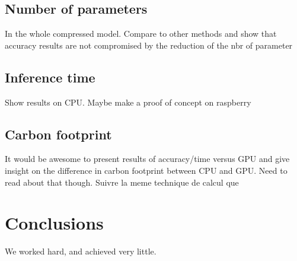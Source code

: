 \documentclass[12pt]{article}
\begin{document}
\subsection{Number of parameters} In the whole compressed model. Compare to other methods and show that accuracy results are not compromised by the reduction of the nbr of parameter

\subsection{Inference time} Show results on CPU. Maybe make a proof of concept on raspberry

\subsection{Carbon footprint} It would be awesome to present results of accuracy/time versus GPU and give insight on the difference in carbon footprint between CPU and GPU. Need to read about that though. Suivre la meme technique de calcul que~\cite{DBLP:journals/corr/abs-1906-02243}


\section{Conclusions}\label{sec:conclusions}
We worked hard, and achieved very little.



\end{document}
